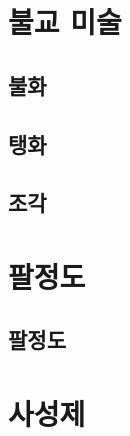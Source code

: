 \documentclass[12pt, a4paper, oneside]{book}
\let\stdsection\section
\renewcommand\section{\newpage\stdsection}
\begin{document}
	\chapter{ 불교 미술 }
	\noptcrule

	\newpage	
	\minitoc


%
	\section{ 불화 }


%
	\section{ 탱화 }


%
	\section{ 조각 }



	\chapter{ 팔정도 }
	\noptcrule

	\newpage	
	\minitoc


%
	\section{ 팔정도 }




	\chapter{ 사성제 }
	\noptcrule
\end{document}
